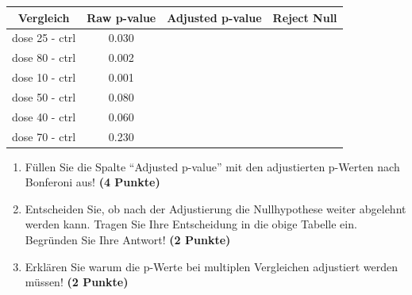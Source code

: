 \documentclass[a4paper, 9pt]{scrartcl}\usepackage[]{graphicx}\usepackage[]{xcolor}
\newenvironment{knitrout}{}{} %
\begin{document}
\begin{knitrout}
\color{fgcolor}\begin{table}[!h]
\centering\begingroup\fontsize{12}{14}\selectfont

\begin{tabular}{cccc}
\toprule
Vergleich & Raw p-value & Adjusted p-value & Reject Null\\
\midrule
dose 25 - ctrl & 0.030 &  & \\
dose 80 - ctrl & 0.002 &  & \\
dose 10 - ctrl & 0.001 &  & \\
dose 50 - ctrl & 0.080 &  & \\
dose 40 - ctrl & 0.060 &  & \\
\addlinespace
dose 70 - ctrl & 0.230 &  & \\
\bottomrule
\end{tabular}
\endgroup{}
\end{table}

\end{knitrout}



\begin{enumerate}
\item F{\"u}llen Sie die Spalte "`Adjusted p-value"' mit den adjustierten
  p-Werten nach Bonferoni aus! \textbf{(4 Punkte)}
\item Entscheiden Sie, ob nach der Adjustierung die Nullhypothese weiter
  abgelehnt werden kann. Tragen Sie Ihre Entscheidung in die obige Tabelle
  ein. Begr{\"u}nden Sie Ihre Antwort! \textbf{(2 Punkte)}
\item Erkl{\"a}ren Sie warum die p-Werte bei multiplen Vergleichen
  adjustiert werden m{\"u}ssen! \textbf{(2 Punkte)}
\end{enumerate}
\end{document}
